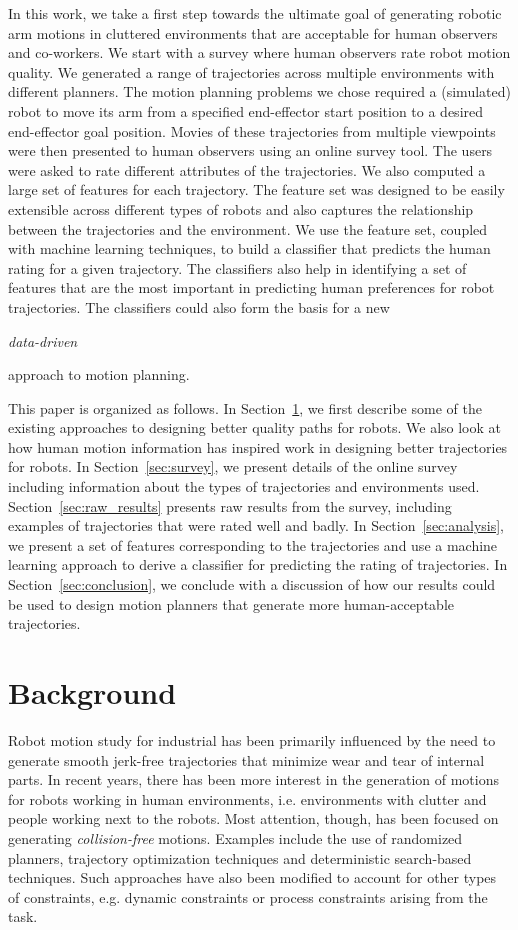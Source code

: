 \documentclass[letterpaper, 10 pt, conference]{ieeeconf}  %
\begin{document}
In this work, we take a first step towards the ultimate goal of generating robotic arm motions in cluttered environments that are acceptable for human observers and co-workers. We start with a survey where human observers rate robot motion quality. We generated a range of trajectories across multiple environments with different planners. The motion planning problems we chose required a (simulated) robot to move its arm from a specified end-effector start position to a desired end-effector goal position. Movies of these trajectories from multiple viewpoints were then presented to human observers using an online survey tool. The users were asked to rate different attributes of the trajectories. We also computed a large set of features for each trajectory. The feature set was designed to be easily extensible across different types of robots and also captures the relationship between the trajectories and the environment. We use the feature set, coupled with machine learning techniques, to build a classifier that predicts the human rating for a given trajectory. The classifiers also help in identifying a set of features that are the most important in predicting human preferences for robot trajectories. The classifiers could also form the basis for a new {\em data-driven{ approach to motion planning. 

This paper is organized as follows. In Section~\ref{sec:background}, we first describe some of the existing approaches to designing better quality paths for robots. We also look at how human motion information has inspired work in designing better trajectories for robots. In Section~\ref{sec:survey}, we present details of the online survey including information about the types of trajectories and environments used. Section~\ref{sec:raw_results} presents raw results from the survey, including examples of trajectories that were rated well and badly. In Section~\ref{sec:analysis}, we present a set of features corresponding to the trajectories and use a machine learning approach to derive a classifier for predicting the rating of trajectories. In Section~\ref{sec:conclusion}, we conclude with a discussion of how our results could be used to design motion planners that generate more human-acceptable trajectories. 

\section{Background}
\label{sec:background}

Robot motion study for industrial has been primarily influenced by the need to generate smooth jerk-free trajectories that minimize wear and tear of internal parts. In recent years, there has been more interest in the generation of motions for robots working in human environments, i.e. environments with clutter and people working next to the robots. Most attention, though, has been focused on generating {\em collision-free} motions. Examples include the use of randomized planners, trajectory optimization techniques and deterministic search-based techniques. Such approaches have also been modified to account for other types of constraints, e.g. dynamic constraints or process constraints arising from the task. 

}}
\end{document}
